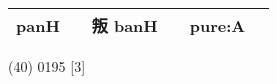 \documentclass[14pt,a4paper]{scrartcl}
\begin{document}
\begin{longtable}[c]{@{}llllll@{}}
\begin{minipage}[t]{0.14\columnwidth}
panH
\strut\end{minipage} &
\begin{minipage}[t]{0.14\columnwidth}\raggedright\strut
\strut\end{minipage} &
\begin{minipage}[t]{0.14\columnwidth}\raggedright\strut
叛 banH
\strut\end{minipage} &
\begin{minipage}[t]{0.14\columnwidth}\raggedright\strut
\strut\end{minipage} &
\begin{minipage}[t]{0.14\columnwidth}\raggedright\strut
pure:A
\strut\end{minipage}\tabularnewline
\bottomrule
\end{longtable}

(40) 0195 {[}3{]}
\end{document}
